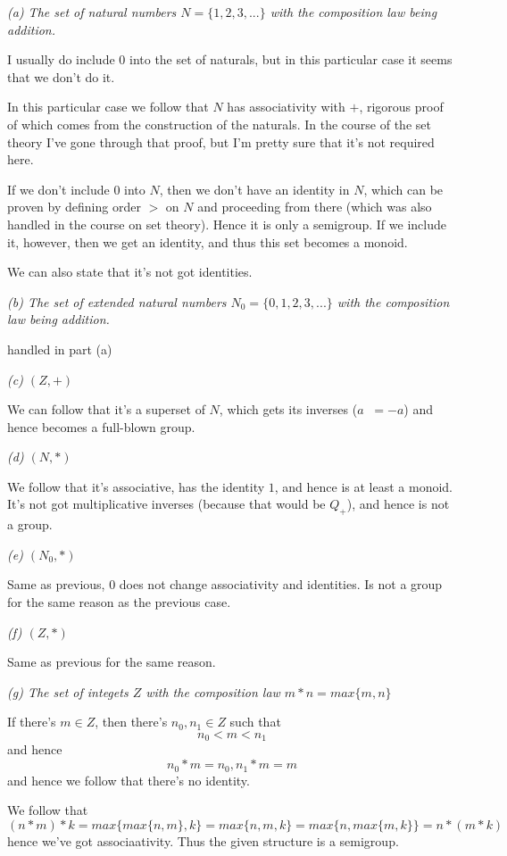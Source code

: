 \documentclass[11pt,oneside,titlepage]{book}
\DeclareMathOperator \inv {^{-1}}
\newcommand{\set}[1]{\{ #1 \}}
\begin{document}
\textit{(a) The set of natural numbers $N = \set{1, 2, 3,
    ...}$ with the composition law being addition.}

I usually do include $0$ into the set of naturals, but in this particular case
it seems that we don't do it.

In this particular case we follow that $N$ has associativity with $+$,
rigorous proof of which comes from the construction of the naturals.
In the course of the set theory I've gone through that proof, but
I'm pretty sure that it's not required here.

If we don't include $0$ into $N$, then we don't have an identity in
$N$, which can be proven by defining order $>$ on $N$ and proceeding
from there (which was also handled in the course on set theory).
Hence it is only a semigroup. If we include it, however, then we get an
identity, and thus this set becomes a monoid.

We can also state that it's not got identities.

\textit{(b) The set of extended  natural numbers $N_0 = \set{0, 1, 2, 3,
    ...}$ with the composition law being addition.}

handled in part (a)

\textit{(c) $(Z, +)$}

We can follow that it's a superset of $N$, which gets its inverses ($a\inv = -a$)
and hence becomes a full-blown group.

\textit{(d) $(N, *)$}

We follow that it's associative, has the identity $1$, and hence is at
least a monoid. It's not got multiplicative inverses (because that
would be $Q_+$), and hence is not a group.

\textit{(e) $(N_0, *)$}

Same as previous, $0$ does not change associativity and identities. Is
not a group for the same reason as the previous case.

\textit{(f) $(Z, *)$}

Same as previous for the same reason.

\textit{(g) The set of integets $Z$ with the composition law $m * n = max\set{m, n}$}

If there's $m \in Z$, then there's $n_0, n_1 \in Z$ such that
$$n_0 < m < n_1$$
and hence
$$n_0 * m = n_0, n_1 * m = m$$
and hence we follow that there's no identity.

We follow that
$$(n * m) * k = max\set{max\set{n, m}, k} = max\set{n, m, k} = max\set{n, max\set{m, k}} = n * (m * k)$$
hence we've got associaativity. Thus the given structure is a semigroup.
\end{document}
